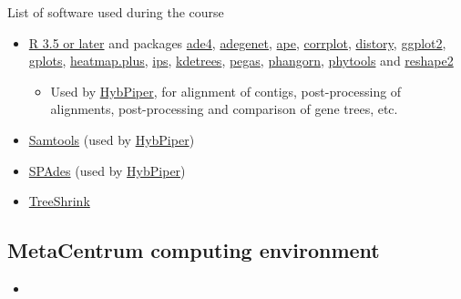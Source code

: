 \documentclass[compress, ucs, xelatex, 11pt, xcolor=x11names, aspectratio=1609,
	hyperref={
		bookmarks=true,
		unicode=true,
		colorlinks=true,
		pdftitle={HybSeq course},
		plainpages=false,
		pdfauthor={Vojtech Zeisek},
		pdfsubject={Practical processing of HybSeq target enrichment sequencing data on computing grids like MetaCentrum},
		pdfcreator={XeLaTeX},
		pdfkeywords={BASH, command line, GNU, HybSeq, Linux, MetaCentrum, sequencing shell, target enrichment},
		linkcolor=Cyan2, %
		anchorcolor=Firebrick2, %
		citecolor=Firebrick2, %
		filecolor=Firebrick2, %
		menucolor=Firebrick2, %
		urlcolor=Chartreuse2, %
		pdftex},
	url={hyphens, lowtilde} %
	]{beamer}
\begin{document}
\begin{frame}[allowframebreaks]{List of software used during the course}
\begin{itemize}
		\item \href{https://www.r-project.org/}{R 3.5 or later} and packages \href{https://cran.r-project.org/package=ade4}{ade4}, \href{https://cran.r-project.org/package=adegenet}{adegenet}, \href{https://cran.r-project.org/package=ape}{ape}, \href{https://cran.r-project.org/package=corrplot}{corrplot}, \href{https://cran.r-project.org/package=distory}{distory}, \href{https://cran.r-project.org/package=ggplot2}{ggplot2}, \href{https://cran.r-project.org/package=gplots}{gplots}, \href{https://cran.r-project.org/package=heatmap.plus}{heatmap.plus}, \href{https://cran.r-project.org/package=ips}{ips}, \href{https://cran.r-project.org/package=kdetrees}{kdetrees}, \href{https://cran.r-project.org/package=pegas}{pegas}, \href{https://cran.r-project.org/package=phangorn}{phangorn}, \href{https://cran.r-project.org/package=phytools}{phytools} and \href{https://cran.r-project.org/package=reshape2}{reshape2}
		\begin{itemize}
			\item Used by \href{https://github.com/mossmatters/HybPiper/wiki}{HybPiper}, for alignment of contigs, post-processing of alignments, post-processing and comparison of gene trees, etc.
		\end{itemize}
		\item \href{https://github.com/samtools/samtools}{Samtools} (used by \href{https://github.com/mossmatters/HybPiper/wiki}{HybPiper})
		\item \href{https://github.com/ablab/spades}{SPAdes} (used by \href{https://github.com/mossmatters/HybPiper/wiki}{HybPiper})
		\item \href{https://github.com/uym2/TreeShrink}{TreeShrink}
	\end{itemize}
\end{frame}

\subsection{MetaCentrum computing environment}

\begin{frame}[fragile]{}
	\begin{itemize}
		\item 
	\end{itemize}
	\begin{spluscode}
    
	\end{spluscode}
	\begin{bashcode}
    
	\end{bashcode}
\end{frame}
\end{document}
